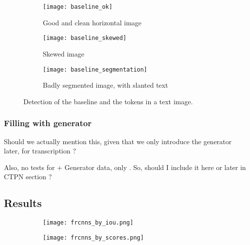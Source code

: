 			\begin{figure}[h!]
				\centering
				\begin{subfigure}{\linewidth}
					\texttt{[image: baseline\_ok]}
					\caption{Good and clean horizontal image}
					\label{fig:baseline_ok}
				\end{subfigure}

				\begin{subfigure}{\linewidth}
					\texttt{[image: baseline\_skewed]}
					\caption{Skewed image}
					\label{fig:baseline_skewed}
				\end{subfigure}

				\begin{subfigure}{\linewidth}
					\texttt{[image: baseline\_segmentation]}
					\caption{Badly segmented image, with slanted text}
					\label{fig:baseline_segmentation}
				\end{subfigure}
				\caption[Baseline and tokens]{Detection of the baseline and the tokens in a text image.}
				\label{fig:baseline}
			\end{figure}


		\subsubsection{Filling with generator}
		\startToDo
			Should we actually mention this, given that we only introduce the generator later, for transcription ?

			Also, no tests for \FRCNN{} + Generator data, only \CTPN{}. So, should I include it here or later in CTPN section ?
		\stopToDo



	\subsection{Results}\label{sec:frcnn_results}
		\begin{figure}[h!]
			\centering
			\begin{subfigure}{.49\linewidth}
				\texttt{[image: frcnns\_by\_iou.png]}
				\caption{}
				\label{fig:frcnns_by_iou}
			\end{subfigure}
			\begin{subfigure}{.49\linewidth}
				\texttt{[image: frcnns\_by\_scores.png]}
				\caption{}
				\label{fig:frcnns_by_scores}
			\end{subfigure}
			\caption[\FRCNN{} results]{}
			\label{fig:frcnn_results}
		\end{figure}




